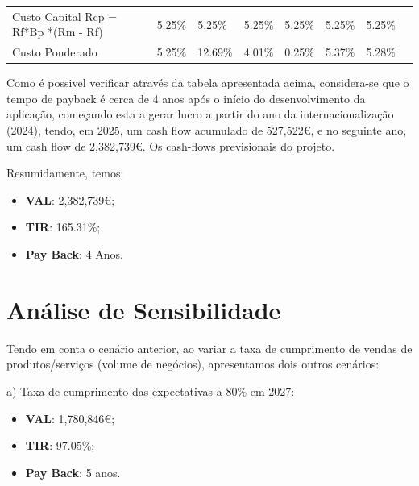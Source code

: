 \documentclass[11pt]{article}
\begin{document}
\begin{adjustbox}{center}
\begin{tabular}{lrrrrrrr}
			\multicolumn{1}{|l|}{Custo Capital Rcp = Rf*Bp *(Rm - Rf)}    & \multicolumn{1}{l|}{5.25\%}    & \multicolumn{1}{l|}{5.25\%}    & \multicolumn{1}{l|}{5.25\%}   & \multicolumn{1}{l|}{5.25\%}    & \multicolumn{1}{l|}{5.25\%}  & \multicolumn{1}{l|}{5.25\%}    & \multicolumn{1}{l}{}           \\ \cline{1-7}
			\multicolumn{1}{|l|}{Custo Ponderado}                         & \multicolumn{1}{l|}{5.25\%}    & \multicolumn{1}{l|}{12.69\%}   & \multicolumn{1}{l|}{4.01\%}   & \multicolumn{1}{l|}{0.25\%}    & \multicolumn{1}{l|}{5.37\%}  & \multicolumn{1}{l|}{5.28\%}    & \multicolumn{1}{l}{}           \\ \cline{1-7}
		\end{tabular}
	\end{adjustbox}
	\normalsize
	
	\vspace{1cm}
	
	Como é possivel verificar através da tabela apresentada acima, considera-se que o tempo de payback é cerca de 4 anos após o início do desenvolvimento da aplicação, começando esta a gerar lucro a partir do ano da internacionalização (2024), tendo, em 2025, um cash flow acumulado de 527,522€, e no seguinte ano, um cash flow de 2,382,739€. Os cash-flows previsionais do projeto.
	
	Resumidamente, temos:
	
	\begin{itemize}
		\item \textbf{VAL}: 2,382,739€;
		\item \textbf{TIR}: 165.31\%;
		\item \textbf{Pay Back}: 4 Anos.
	\end{itemize}
	
	\pagebreak
	
	\large
	\section{Análise de Sensibilidade}
	
	\normalsize
	
	Tendo em conta o cenário anterior, ao variar a taxa de cumprimento de vendas de produtos/serviços (volume de negócios), apresentamos dois outros cenários:
	
	a)
	Taxa de cumprimento das expectativas a 80\% em 2027:
	\begin{itemize}
		\item \textbf{VAL}: 1,780,846€;
		\item \textbf{TIR}: 97.05\%;
		\item \textbf{Pay Back}: 5 anos.
	\end{itemize}
	
\end{document}
